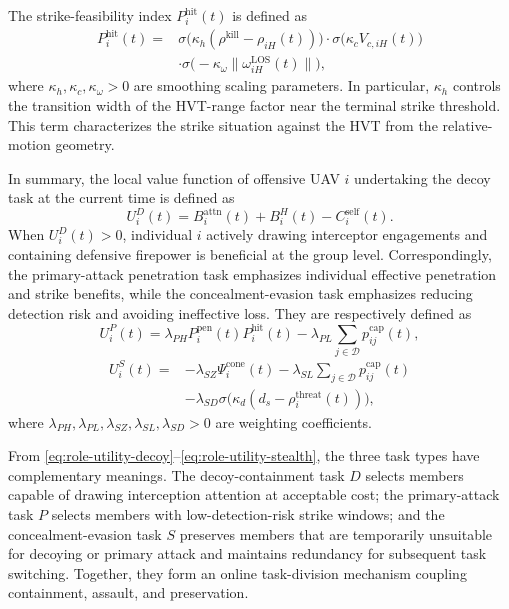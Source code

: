 \documentclass{cja}
\begin{document}
The strike-feasibility index $P_i^{\mathrm{hit}}(t)$ is defined as
\begin{equation}
\begin{aligned}
P_i^{\mathrm{hit}}(t)
={}&
\sigma\!\bigl(\kappa_h(\rho^{\mathrm{kill}}-\rho_{iH}(t))\bigr)
\cdot
\sigma\!\bigl(\kappa_c V_{c,iH}(t)\bigr)\\
&\cdot
\sigma\!\bigl(-\kappa_{\omega}\|\omega_{iH}^{\mathrm{LOS}}(t)\|\bigr),
\end{aligned}
\label{eq:P_hit_def}
\end{equation}
where $\kappa_h,\kappa_c,\kappa_{\omega}>0$ are smoothing scaling parameters. In particular, $\kappa_h$ controls the transition width of the HVT-range factor near the terminal strike threshold. This term characterizes the strike situation against the HVT from the relative-motion geometry.

In summary, the local value function of offensive UAV $i$ undertaking the decoy task at the current time is defined as
\begin{equation}
U_i^{D}(t)
=
B_i^{\mathrm{attn}}(t)
+
B_i^{H}(t)
-
C_i^{\mathrm{self}}(t).
\label{eq:role-utility-decoy}
\end{equation}
When $U_i^{D}(t)>0$, individual $i$ actively drawing interceptor engagements and containing defensive firepower is beneficial at the group level.
Correspondingly, the primary-attack penetration task emphasizes individual effective penetration and strike benefits, while the concealment-evasion task emphasizes reducing detection risk and avoiding ineffective loss. They are respectively defined as
\begin{equation}
U_i^{P}(t)
=
\lambda_{PH}P_i^{\mathrm{pen}}(t)P_i^{\mathrm{hit}}(t)
-
\lambda_{PL}\sum_{j\in\mathcal D}p_{ij}^{\mathrm{cap}}(t),
\label{eq:role-utility-pen}
\end{equation}
\begin{equation}
\begin{aligned}
U_i^{S}(t)
={}&
-\lambda_{SZ}\Psi_i^{\mathrm{cone}}(t)
-\lambda_{SL}\sum_{j\in\mathcal D}p_{ij}^{\mathrm{cap}}(t)\\
&-\lambda_{SD}\sigma\!\bigl(\kappa_d(d_s-\rho_i^{\mathrm{threat}}(t))\bigr),
\end{aligned}
\label{eq:role-utility-stealth}
\end{equation}
where $\lambda_{PH},\lambda_{PL},\lambda_{SZ},\lambda_{SL},\lambda_{SD}>0$ are weighting coefficients.

From \eqref{eq:role-utility-decoy}--\eqref{eq:role-utility-stealth}, the three task types have complementary meanings. The decoy-containment task $D$ selects members capable of drawing interception attention at acceptable cost; the primary-attack task $P$ selects members with low-detection-risk strike windows; and the concealment-evasion task $S$ preserves members that are temporarily unsuitable for decoying or primary attack and maintains redundancy for subsequent task switching. Together, they form an online task-division mechanism coupling containment, assault, and preservation.
\end{document}
